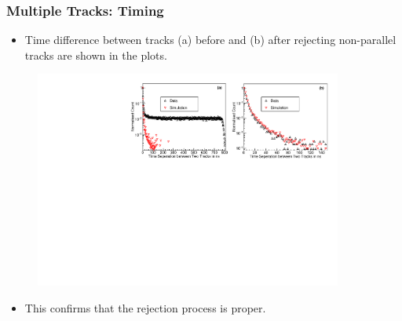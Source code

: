 \documentclass{beamer}
\begin{document}
\begin{frame}
  \frametitle{Multiple Tracks: Timing}
  \begin{itemize} %
  \item Time difference between tracks (a) before and (b) after rejecting non-parallel tracks are shown in the plots.
  \end{itemize}
  \begin{figure}[!h]
    \vspace{-8pt}
    \includegraphics[width=0.9\textwidth]{time_diff_compare_all.pdf}
    \vspace{-8pt}
  \end{figure}
  \begin{itemize} %
  \item This confirms that the rejection process is proper.
  \end{itemize}
\end{frame}
\end{document}
